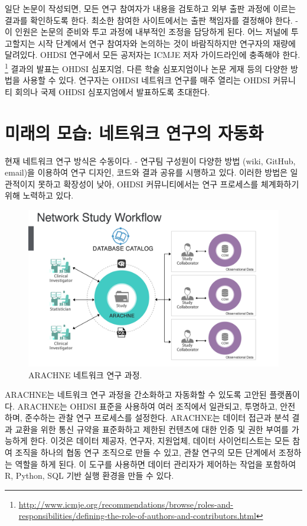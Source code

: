 \documentclass[10.5pt]{book}
\let\rmarkdownfootnote\footnote%
\def\footnote{\protect\rmarkdownfootnote}
\theoremstyle{definition}
\theoremstyle{definition}
\theoremstyle{definition}
\theoremstyle{remark}
\begin{document}
일단 논문이 작성되면, 모든 연구 참여자가 내용을 검토하고 외부 출판
과정에 이르는 결과를 확인하도록 한다. 최소한 참여한 사이트에서는 출판
책임자를 결정해야 한다. - 이 인원은 논문의 준비와 투고 과정에 내부적인
조정을 담당하게 된다. 어느 저널에 투고할지는 시작 단계에서 연구 참여자와
논의하는 것이 바람직하지만 연구자의 재량에 달려있다. OHDSI 연구에서 모든
공저자는 ICMJE 저자 가이드라인에 충족해야 한다. \footnote{\url{http://www.icmje.org/recommendations/browse/roles-and-responsibilities/defining-the-role-of-authors-and-contributors.html}}
결과의 발표는 OHDSI 심포지엄, 다른 학술 심포지엄이나 논문 게재 등의
다양한 방법을 사용할 수 있다. 연구자는 OHDSI 네트워크 연구를 매주 열리는
OHDSI 커뮤니티 회의나 국제 OHDSI 심포지엄에서 발표하도록 초대한다.

\section{미래의 모습: 네트워크 연구의 자동화}\label{----}


현재 네트워크 연구 방식은 수동이다. - 연구팀 구성원이 다양한 방법 (wiki,
GitHub, email)을 이용하여 연구 디자인, 코드와 결과 공유를 시행하고 있다.
이러한 방법은 일관적이지 못하고 확장성이 낮아, OHDSI 커뮤니티에서는 연구
프로세스를 체계화하기 위해 노력하고 있다.

\begin{figure}[h]

{\centering \includegraphics[width=0.9\linewidth]{images/NetworkStudies/ARACHNE} 

}

\caption{ARACHNE 네트워크 연구 과정.}\label{fig:arachne}
\end{figure}

ARACHNE는 네트워크 연구 과정을 간소화하고 자동화할 수 있도록 고안된
플랫폼이다. ARACHNE는 OHDSI 표준을 사용하여 여러 조직에서 일관되고,
투명하고, 안전하며, 준수하는 관찰 연구 프로세스를 설정한다. ARACHNE는
데이터 접근과 분석 결과 교환을 위한 통신 규약을 표준화하고 제한된
컨텐츠에 대한 인증 및 권한 부여를 가능하게 한다. 이것은 데이터 제공자,
연구자, 지원업체, 데이터 사이언티스트는 모든 참여 조직을 하나의 협동
연구 조직으로 만들 수 있고, 관찰 연구의 모든 단계에서 조정하는 역할을
하게 된다. 이 도구를 사용하면 데이터 관리자가 제어하는 작업을 포함하여
R, Python, SQL 기반 실행 환경을 만들 수 있다.
\end{document}
